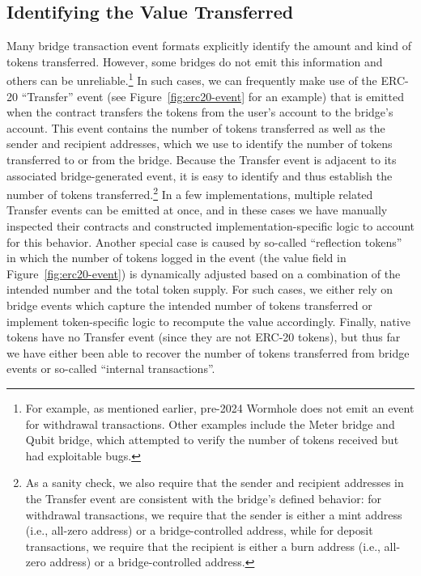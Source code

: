 \subsection{Identifying the Value Transferred}
Many bridge transaction event formats explicitly identify the amount
and kind of tokens transferred. However, some bridges do not emit this
information and others can be unreliable.\footnote{For example, as
  mentioned earlier, pre-2024 Wormhole does not emit an event for
  withdrawal transactions. Other examples include the Meter bridge and
  Qubit bridge, which attempted to verify the number of tokens
  received but had exploitable bugs.}  In such cases, we can
frequently make use of the ERC-20 ``Transfer'' event (see
Figure~\ref{fig:erc20-event} for an example) that is emitted when the
contract transfers the tokens from the user's account to the bridge's
account.  This event contains the number of tokens transferred as well
as the sender and recipient addresses, which we use to identify the
number of tokens transferred to or from the bridge.  Because the
Transfer event is adjacent to its associated bridge-generated event,
it is easy to identify and thus establish the number of tokens
transferred.\footnote{As a sanity check, we also require that the
  sender and recipient addresses in the Transfer event are consistent
  with the bridge's defined behavior: for withdrawal transactions, we
  require that the sender is either a mint address (i.e., all-zero
  address) or a bridge-controlled address, while for deposit
  transactions, we require that the recipient is either a burn address
  (i.e., all-zero address) or a bridge-controlled address.}  In a few
implementations, multiple related Transfer events can be emitted at
once, and in these cases we have manually inspected their contracts
and constructed implementation-specific logic to account for this
behavior.  Another special case is caused by so-called ``reflection
tokens'' in which the number of tokens logged in the event (the value
field in Figure~\ref{fig:erc20-event}) is dynamically adjusted based
on a combination of the intended number and the total token supply.
For such cases, we either rely on bridge events which capture the
intended number of tokens transferred or implement token-specific
logic to recompute the value accordingly.  Finally, native tokens have
no Transfer event (since they are not ERC-20 tokens), but thus far we
have either been able to recover the number of tokens transferred from
bridge events or so-called ``internal transactions''.

